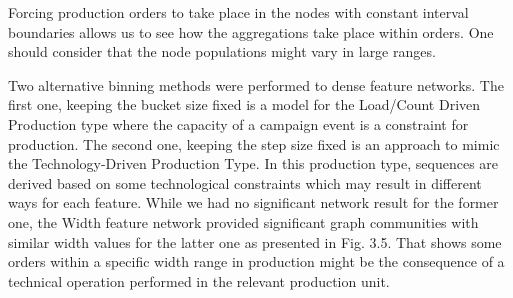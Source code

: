 Forcing production orders to take place in the nodes with constant interval
boundaries allows us to see how the aggregations take place within orders.
One should consider that the node populations might vary in large ranges.

Two alternative binning methods were performed to dense
feature networks. The first one, keeping the bucket size fixed is a model for the
Load/Count Driven Production type where the capacity of a campaign event is
a constraint for production. The second one, keeping the step size fixed is an
approach to mimic the Technology-Driven Production Type. In this production
type, sequences are derived based on some technological constraints which
may result in different ways for each feature. While we had no significant network
result for the former one, the Width feature network provided significant
graph communities with similar width values for the latter one as presented in
Fig. 3.5. That shows some orders within a specific width range in production
might be the consequence of a technical operation performed in the relevant
production unit.